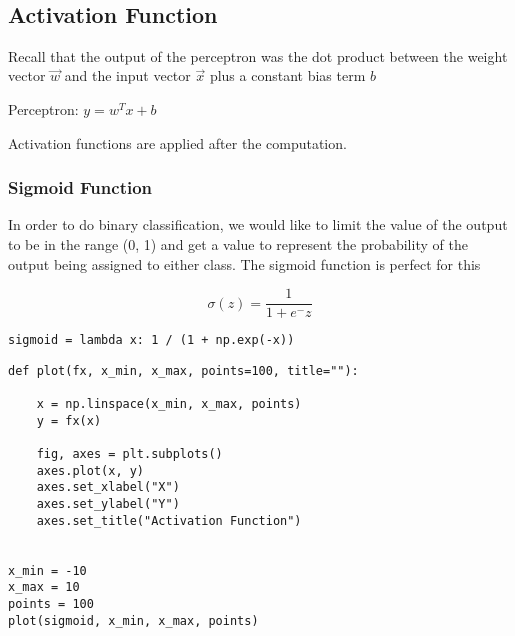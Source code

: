 \documentclass[openany]{book}
\begin{document}
    \begin{center}
    \end{center}
    { \hspace*{\fill} \\}
    
    \subsection{Activation Function}\label{activation-function}

Recall that the output of the perceptron was the dot product between the
weight vector \(\vec{w}\) and the input vector \(\vec{x}\) plus a
constant bias term \(b\)

Perceptron: \(y=w^Tx + b\)

Activation functions are applied after the computation.

    \subsubsection{Sigmoid Function}\label{sigmoid-function}

In order to do binary classification, we would like to limit the value
of the output to be in the range (0, 1) and get a value to represent the
probability of the output being assigned to either class. The sigmoid
function is perfect for this

\[ \sigma(z) = \frac{1}{1+e^-z} \]

\begin{tcolorbox}
\tiny
\begin{verbatim}
sigmoid = lambda x: 1 / (1 + np.exp(-x))
\end{verbatim}
\end{tcolorbox}

\begin{tcolorbox}
\tiny
\begin{verbatim}
def plot(fx, x_min, x_max, points=100, title=""):

    x = np.linspace(x_min, x_max, points)
    y = fx(x)

    fig, axes = plt.subplots()
    axes.plot(x, y)
    axes.set_xlabel("X")
    axes.set_ylabel("Y")
    axes.set_title("Activation Function")


x_min = -10
x_max = 10
points = 100
plot(sigmoid, x_min, x_max, points)
\end{verbatim}
\end{tcolorbox}
\end{document}
